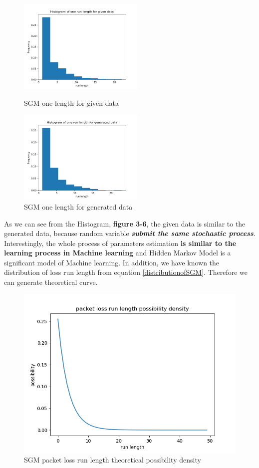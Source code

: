 \documentclass[11pt]{article}
\begin{document}
\begin{figure}[htbp]
    \centering
    \begin{minipage}[t]{0.48\textwidth}
    \centering
    \includegraphics[width=6cm]{Histogram_of_one_run_length_for_given_data.png}
    \caption{SGM one length for given data}
    \end{minipage}
    \begin{minipage}[t]{0.48\textwidth}
    \centering
    \includegraphics[width=6cm]{Histogram_of_one_run_length_for_generated_data.png}
    \caption{SGM one length for generated data}
    \end{minipage}
\end{figure}
As we can see from the Histogram, \textbf{figure 3-6}, the given data is similar to the generated data, because random variable \textbf{\emph{submit the same stochastic process}}. 
Interestingly, the whole process of parameters estimation \textbf{is similar to the learning process in Machine learning} and Hidden Markov Model is a significant model of Machine learning.
In addition, we have known the distribution of loss run length from equation \ref{distributionofSGM}. 
Therefore we can generate theoretical curve. 
\begin{figure}[htb]
    \centering
    \includegraphics[scale = 0.6]{packet_loss_run_length_possibility_density.png}
    \caption{SGM packet loss run length theoretical possibility density}
    \label{SGMTD}
\end{figure}
\end{document}
